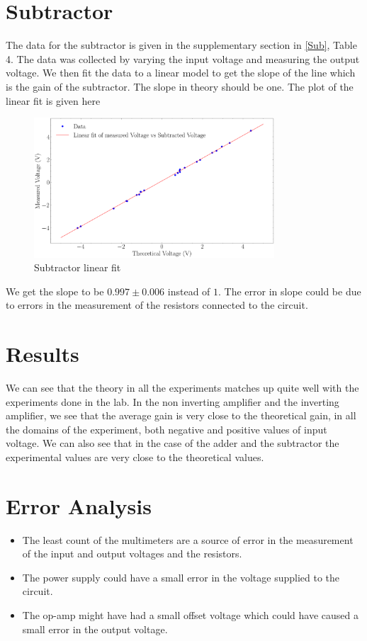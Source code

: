 \documentclass{scrartcl}
\newcommand{\1}{\mathbbm{1}}
\begin{document}
\section{Subtractor}
The data for the subtractor is given in the supplementary section in \cref{Sub}, Table 4. The data was collected by varying the input voltage and measuring the output voltage.
We then fit the data to a linear model to get the slope of the line which is the gain of the subtractor. The slope in theory should be one.
The plot of the linear fit is given here
\begin{figure}[H]
    \centering
    \includegraphics[width=0.8\textwidth]{Sub_plot.png}
    \caption{Subtractor linear fit}
\end{figure}
We get the slope to be $\mathbf{0.997 \pm 0.006} $ instead of $1$. The error in slope could be due to errors in the measurement of the resistors connected to the circuit.
\section{Results}
We can see that the theory in all the experiments matches up quite well with the experiments done in the lab. 
In the non inverting amplifier and the inverting amplifier, we see that the average gain is very close to the theoretical gain, in all the domains of the experiment,
both negative and positive values of input voltage. We can also see that in the case of the adder and the subtractor the experimental values are very close to the theoretical values.
\section{Error Analysis}
\begin{itemize}
    \item The least count of the multimeters are a source of error in the measurement of the input and output voltages and the resistors.
    \item The power supply could have a small error in the voltage supplied to the circuit.
    \item The op-amp might have had a small offset voltage which could have caused a small error in the output voltage.
\end{itemize}
\end{document}
